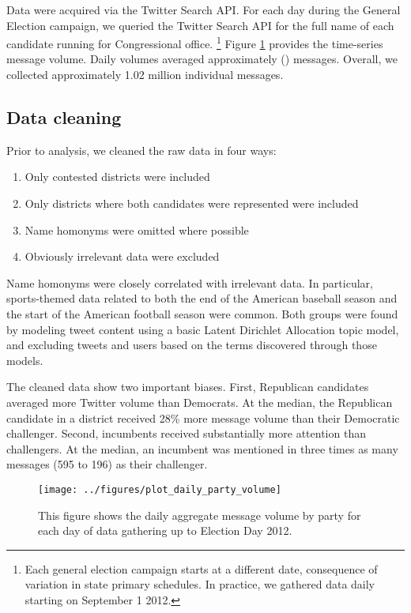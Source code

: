 \documentclass[11pt]{article}
\begin{document}
Data were acquired via the Twitter Search API. For each day during the
General Election campaign, we queried the Twitter Search API for the
full name of each candidate running for Congressional office. \footnote{Each general election campaign
  starts at a different date, consequence of variation in state
  primary schedules. In practice, we gathered data daily starting on
  September 1 2012.} Figure \ref{fig:daily-msg-volume} provides the
time-series message volume. Daily volumes averaged approximately ()
messages. Overall, we collected approximately 1.02 million individual
messages.

\subsection{Data cleaning}
\label{sec:data-cleaning}

Prior to analysis, we cleaned the raw data in four ways:
\begin{enumerate}
\item Only contested districts were included
\item Only districts where both candidates were represented were included
\item Name homonyms were omitted where possible
\item Obviously irrelevant data were excluded
\end{enumerate}

Name homonyms were closely correlated with irrelevant data. In
particular, sports-themed data related to both the end of the American
baseball season and the start of the American football season were
common. Both groups were found by modeling tweet content using a basic
Latent Dirichlet Allocation topic model, and excluding tweets and
users based on the terms discovered through those models.

The cleaned data show two important biases. First, Republican
candidates averaged more Twitter volume than Democrats. At the median,
the Republican candidate in a district received 28\% more message
volume than their Democratic challenger. Second, incumbents received
substantially more attention than challengers. At the median, an
incumbent was mentioned in three times as many messages (595 to 196)
as their challenger.




\begin{figure}[ht]
  \centering
  \texttt{[image: ../figures/plot\_daily\_party\_volume]}
  \caption{This figure shows the daily aggregate message volume by party for each day of data gathering up to Election Day 2012. }
  \label{fig:daily-msg-volume}
\end{figure}
\end{document}
